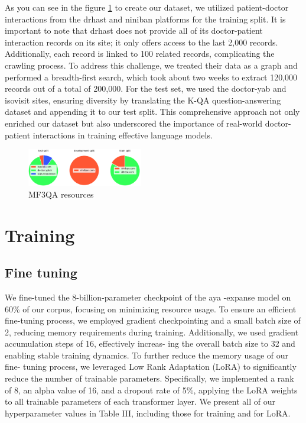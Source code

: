 \documentclass[conference]{IEEEtran}
\begin{document}
As you can see in the figure
\ref{fig2}
to create our dataset, we utilized patient-doctor interactions from the drhast and niniban platforms for the training split. It is important to note that drhast does not provide all of its doctor-patient interaction records on its site; it only offers access to the last 2,000 records. Additionally, each record is linked to 100 related records, complicating the crawling process. To address this challenge, we treated their data as a graph and performed a breadth-first search, which took about two weeks to extract 120,000 records out of a total of 200,000. For the test set, we used the doctor-yab and isovisit sites, ensuring diversity by translating the K-QA question-answering dataset
\cite{b25}
and appending it to our test split. This comprehensive approach not only enriched our dataset but also underscored the importance of real-world doctor-patient interactions in training effective language models.

\begin{figure}[htbp]
	\centerline{\includegraphics[width=0.45\textwidth]{fig2.png}}
	\caption{MF3QA resources}
	\label{fig2}
\end{figure}

\section{Training}
\subsection{Fine tuning}
We fine-tuned the 8-billion-parameter checkpoint of the aya
-expanse model on 60\% of our corpus, focusing on minimizing
resource usage. To ensure an efficient fine-tuning process, we
employed gradient checkpointing and a small batch size of 2,
reducing memory requirements during training. Additionally,
we used gradient accumulation steps of 16, effectively increas-
ing the overall batch size to 32 and enabling stable training
dynamics. To further reduce the memory usage of our fine-
tuning process, we leveraged Low Rank Adaptation (LoRA)
\cite{b26}
to significantly reduce the number of trainable parameters.
Specifically, we implemented a rank of 8, an alpha value of
16, and a dropout rate of 5\%, applying the LoRA weights to
all trainable parameters of each transformer layer. We present
all of our hyperparameter values in Table III, including those
for training and for LoRA.
\end{document}
